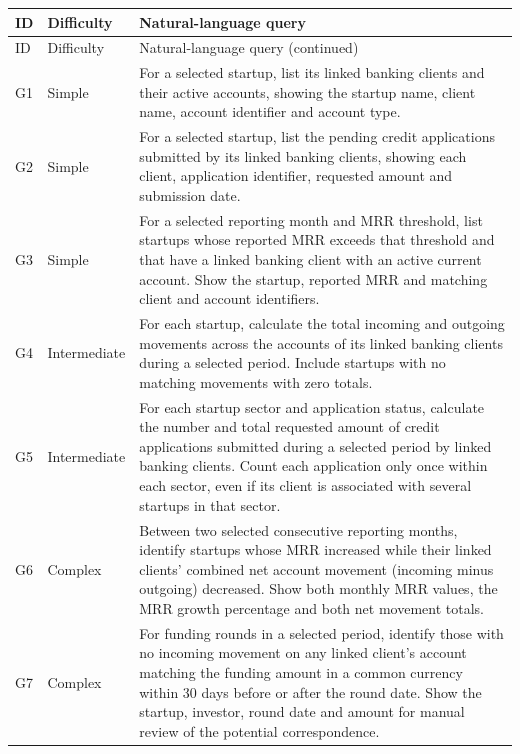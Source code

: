 \documentclass[11pt,a4paper]{article}
\begin{document}
\begingroup
\renewcommand{\arraystretch}{1.2}
\begin{longtable}{@{}p{0.8cm} p{2.2cm} p{\dimexpr\textwidth-3cm-4\tabcolsep\relax}@{}}
\toprule
ID & Difficulty & Natural-language query\\
\midrule
\endfirsthead
\toprule
ID & Difficulty & Natural-language query (continued)\\
\midrule
\endhead
\bottomrule
\endfoot

G1 & Simple &
For a selected startup, list its linked banking clients and their active
accounts, showing the startup name, client name, account identifier and
account type.\\

G2 & Simple &
For a selected startup, list the pending credit applications submitted by
its linked banking clients, showing each client, application identifier,
requested amount and submission date.\\

G3 & Simple &
For a selected reporting month and MRR threshold, list startups whose
reported MRR exceeds that threshold and that have a linked banking client
with an active current account. Show the startup, reported MRR and
matching client and account identifiers.\\

G4 & Intermediate &
For each startup, calculate the total incoming and outgoing movements
across the accounts of its linked banking clients during a selected period.
Include startups with no matching movements with zero totals.\\

G5 & Intermediate &
For each startup sector and application status, calculate the number and
total requested amount of credit applications submitted during a selected
period by linked banking clients. Count each application only once within
each sector, even if its client is associated with several startups in that
sector.\\

G6 & Complex &
Between two selected consecutive reporting months, identify startups whose
MRR increased while their linked clients' combined net account movement
(incoming minus outgoing) decreased. Show both monthly MRR values, the MRR
growth percentage and both net movement totals.\\

G7 & Complex &
For funding rounds in a selected period, identify those with no incoming
movement on any linked client's account matching the funding amount in a
common currency within 30 days before or after the round date. Show the
startup, investor, round date and amount for manual review of the potential
correspondence.\\


\end{longtable}
\end{document}
